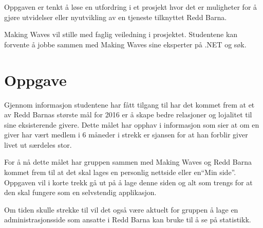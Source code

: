 Oppgaven er tenkt å løse en utfordring i et prosjekt hvor det er muligheter for å gjøre utvidelser eller nyutvikling av en tjeneste tilknyttet Redd Barna.

Making Waves vil stille med faglig veiledning i prosjektet. Studentene kan forvente å jobbe sammen med Making Waves sine eksperter på .NET og søk.

\section{Oppgave}
Gjennom informasjon studentene har fått tilgang til har det kommet frem at et av Redd Barnas største mål for 2016 er å skape bedre relasjoner og lojalitet til sine eksisterende givere. Dette målet har opphav i informasjon som sier at om en giver har vært medlem i 6 måneder i strekk er sjansen for at han forblir giver livet ut særdeles stor.

For å nå dette målet har gruppen sammen med Making Waves og Redd Barna kommet frem til at det skal lages en personlig nettside eller en``Min side''. Oppgaven vil i korte trekk gå ut på å lage denne siden og alt som trengs for at den skal fungere som en selvstendig applikasjon.

Om tiden skulle strekke til vil det også være aktuelt for gruppen å lage en administrasjonsside som ansatte i Redd Barna kan bruke til å se på statistikk.
